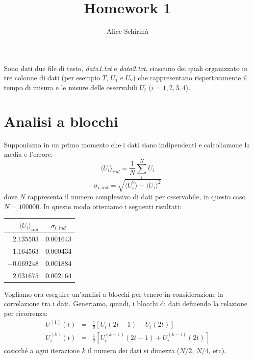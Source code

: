 \documentclass[a4paper,10pt]{article}
\begin{document}
 \title{\sc Homework 1}
\author{\sc Alice Schirinà}
\maketitle
	
\noindent Sono dati due file di testo, \textit{data1.txt} e \textit{data2.txt}, ciascuno dei quali organizzato in tre colonne di dati (per esempio $T$, $U_1$ e $U_2$) che rappresentano rispettivamente il tempo di misura e le misure delle osservabili $U_i$ ($i=1,2,3,4$). 
\section{Analisi a blocchi}
Supponiamo in un primo momento che i dati siano indipendenti e calcoliamone la media e l'errore:
\begin{equation*}
\langle U_i \rangle_{ind} = \frac{1}{N} \sum_{i}^{N} {U_i}
\end{equation*}
\begin{equation*}
\sigma_{i,ind}=\sqrt{\langle U_i^2 \rangle - \langle U_i \rangle ^2}
\end{equation*}
dove $N$ rappresenta il numero complessivo di dati per osservabile, in questo caso $N=100000$. In questo modo otteniamo i  seguenti risultati:
\medskip 
\begin{table}[H]
	\centering
	\begin{tabular}{rc} 
	\hline
	$\langle U_i  \rangle_{ind} $      &	$\sigma _{i,ind}$  \\
	\hline
	$2.135503$       & $0.001643$  \\
	$1.164563$       & $0.000434$  \\
	$-0.069248$      & $0.001884$  \\
	$2.031675$       & $0.002164$  \\
	\hline
	\end{tabular}
\end{table}
\medskip
\noindent Vogliamo ora eseguire un'analisi a blocchi per tenere in considerazione la correlazione tra i dati. Generiamo, quindi, i blocchi di dati definendo la relazione per ricorrenza:
\begin{eqnarray*}
	U^{(1)}(t)&=&\frac{1}{2} [U_i(2t-1)+U_i(2t)]\\
	U_i^{(k)}(t)&=&\frac{1}{2}[U_i^{(k-1)}(2t-1)+U_i^{(k-1)}(2t)]
\end{eqnarray*}
\medskip
cosicché a ogni iterazione $k$ il numero dei dati si dimezza ($N/2$, $N/4$, etc). \\
\end{document}
